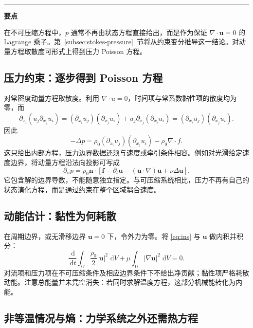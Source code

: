 \documentclass[cn,hazy,blue,11pt,normal]{elegantnote}
\numberwithin{equation}{section}
\newcommand{\dd}{\,\mathrm d}
\newcommand{\vct}[1]{\bm{#1}}
\newenvironment{keypoint}{%
  \par\medskip\noindent\color{blue!60!black}\rule{0.8em}{0.8em}\quad
  \begin{minipage}{0.91\linewidth}\color{black}\textbf{要点}\quad
}{\end{minipage}\par\medskip}
\begin{document}
\begin{keypoint}
在不可压缩方程中，$p$ 通常不再由状态方程直接给出，而是作为保证 $\nabla\cdot\vct u=0$ 的 Lagrange 乘子。第~\ref{subsec:stokes-pressure}~节将从约束变分推导这一结论。对动量方程取散度可形式上得到压力 Poisson 方程。
\end{keypoint}

\subsection{压力约束：逐步得到 Poisson 方程}

对常密度动量方程取散度。利用 $\nabla\cdot u=0$，时间项与常系数黏性项的散度均为零，而
\begin{equation}
 \partial_{x_i}(u_j\partial_{x_j}u_i)
 =(\partial_{x_i}u_j)(\partial_{x_j}u_i)
 +u_j\partial_{x_j}(\partial_{x_i}u_i)
 =(\partial_{x_i}u_j)(\partial_{x_j}u_i).
\end{equation}
因此
\begin{equation}
 -\Delta p=\rho_0(\partial_{x_i}u_j)(\partial_{x_j}u_i)
 -\rho_0\nabla\cdot f.
\end{equation}
这只给出内部方程，压力边界数据还须与速度或牵引条件相容。例如对光滑给定速度边界，将动量方程沿法向投影可写成
\begin{equation}
 \partial_n p=\rho_0\vct n\cdot
 [\vct f-\partial_t\vct u-(\vct u\cdot\nabla)\vct u+\nu\Delta\vct u].
\end{equation}
它包含解的边界导数，不能随意独立指定。与可压缩系统相比，压力不再有自己的状态演化方程，而是通过约束在整个区域耦合速度。

\subsection{动能估计：黏性为何耗散}

在周期边界，或无滑移边界 $\vct u=0$ 下，令外力为零。将 \eqref{eq:ins} 与 $\vct u$ 做内积并积分：
\begin{equation}
 \frac{\dd}{\dd t}\int_\Omega\frac{\rho_0}{2}|\vct u|^2\,\dd V
 +\mu\int_\Omega|\nabla\vct u|^2\,\dd V=0.
\end{equation}
对流项和压力项在不可压缩条件及相应边界条件下不给出净贡献；黏性项严格耗散动能。注意总能量并未凭空消失：若同时求解温度方程，这部分机械能转化为内能。

\subsection{非等温情况与熵：力学系统之外还需热方程}
\end{document}
